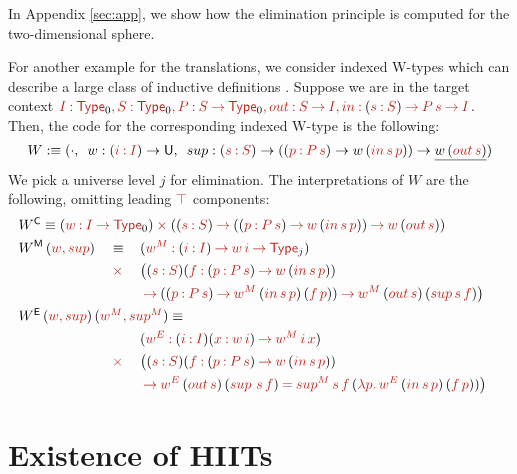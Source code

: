 \documentclass[a4paper,UKenglish]{lipics-v2018}
\newcommand{\U}{\mathsf{U}}
\newcommand{\ra}{\rightarrow}
\newcommand{\C}{\mathsf{C}}
\newcommand{\M}{\mathsf{M}}
\newcommand{\1}{\mathsf{1}} \renewcommand{\Pr}{\mathsf{Pr}}
\renewcommand{\in}{\mathbin{\hat:}}
\renewcommand{\hat}[1]{{\color{BrickRed}{#1}}}
\newcommand{\rah}{\mathbin{\hat\ra}}
\newcommand{\commah}{\hat,\,}
\newcommand{\timesh}{\mathbin{\hat\times}}
\newcommand{\eqh}{\mathbin{\hat=}}
\newcommand{\Type}{\hat{\mathsf{Type}}}
\begin{document}
In Appendix \ref{sec:app}, we show how the elimination principle is
computed for the two-dimensional sphere.

For another example for the translations, we consider indexed W-types
which can describe a large class of inductive definitions
\cite{morris09indexed}. Suppose we are in the target context $\hat{I}
\in \Type_0\commah\hat{S} \in \Type_0\commah\hat{P} \in \hat{S} \rah
\Type_0\commah\hat{out} \in \hat{S} \rah \hat{I}\commah\hat{in} \in
(\hat{s} \in \hat{S})\rah \hat{P}\,\hat{s}\rah \hat{I}$. Then, the
code for the corresponding indexed W-type is the following:
\[
W :\equiv (\cdot,\,\,\,w:(\hat{i} \in \hat{I})\ra\U,\,\,\,sup: (\hat{s} \in \hat{S})\ra((\hat{p} \in \hat{P\,s})\ra w\,(\hat{in\,s\,p}))\ra \underline{w\,(\hat{out\,s})})
\]
We pick a universe level $j$ for elimination. The interpretations of $W$ are the following, omitting leading $\hat{\top}$ components:
\begin{alignat*}{5}
  & \rlap{$W^\C \equiv (\hat{w}\in \hat{I}\rah\Type_0)\timesh((\hat{s}\in \hat{S})\rah((\hat{p}\in \hat{P\,s})\rah \hat{w}\,(\hat{in\,s\,p}))\rah \hat{w}\,(\hat{out\,s}))$}\\
  & W^\M\,(\hat{w, sup}) && \equiv\, && (\hat{w^M} \in (\hat{i}\in \hat{I})\rah \hat{w\,i}\rah \Type_j)\\
  & && \hspace{0.23em}\timesh && \big((\hat{s\in S})(\hat{f}\in (\hat{p\in P\,s})\rah \hat{w}\,(\hat{in\,s\,p}))\\
  & && && \rah ((\hat{p\in P\,s})\rah \hat{w^M}\,(\hat{in\,s\,p})\,(\hat{f\,p}))\rah \hat{w^M}\,(\hat{out\,s})\,(\hat{sup\,s\,f})\big) \\
  & \rlap{$ W^\E\,(\hat{w, sup})\,(\hat{w^M,sup^M}) \equiv $} \\
  & && && (\hat{w^E} \in (\hat{i \in I})(\hat{x \in w\,i})\rah \hat{w^M\,i\,x})\\
  & && \hspace{0.23em}\timesh && \big((\hat{s\in S})(\hat{f}\in (\hat{p\in P\,s})\rah \hat{w}\,(\hat{in\,s\,p}))\\
  & && && \rah \hat{w^E}\,(\hat{out\,s})\,(\hat{sup\,\,s\,f}) \eqh \hat{sup^M\,s\,f}\,(\hat{\lambda} \hat{p.}\, \hat{w^E}\,(\hat{in\,s\,p})\,(\hat{f\,p}))\big)
\end{alignat*}


\section{Existence of HIITs}
\label{sec:adding}
\end{document}
